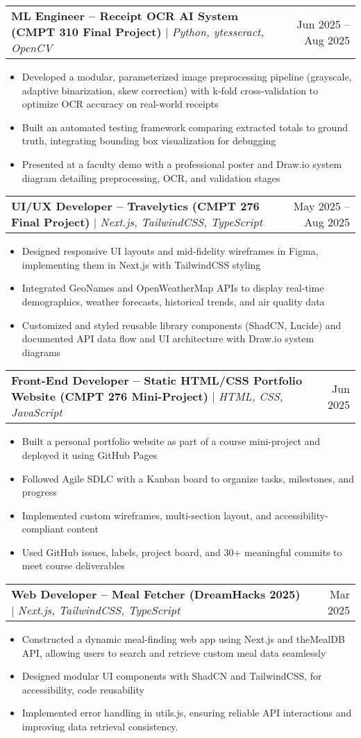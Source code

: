 \documentclass[letterpaper,10pt]{article}
\makeatletter
\newcommand{\resumeItem}[1]{
  \item\small{
    {#1 \vspace{-2pt}}
  }
}
\newcommand{\resumeProjectHeading}[2]{
    \item
    \begin{tabular*}{0.97\textwidth}{l@{\extracolsep{\fill}}r}
      \small#1 & #2 \\
    \end{tabular*}\vspace{-7pt}
}
\newcommand{\resumeItemListStart}{\begin{itemize}}
\newcommand{\resumeItemListEnd}{\end{itemize}\vspace{-5pt}}
\makeatother
\begin{document}
   \resumeProjectHeading
  {\textbf{ML Engineer – Receipt OCR AI System (CMPT 310 Final Project)} $|$ \emph{Python, ytesseract, OpenCV}}{Jun 2025 -- Aug 2025}
    \resumeItemListStart
      \resumeItem{Developed a modular, parameterized image preprocessing pipeline (grayscale, adaptive binarization, skew correction) with k-fold cross-validation to optimize OCR accuracy on real-world receipts}
      \resumeItem{Built an automated testing framework comparing extracted totals to ground truth, integrating bounding box visualization for debugging}
      \resumeItem{Presented at a faculty demo with a professional poster and Draw.io system diagram detailing preprocessing, OCR, and validation stages}
    \resumeItemListEnd



  
    \resumeProjectHeading
  {\textbf{UI/UX Developer – Travelytics (CMPT 276 Final Project)} $|$ \emph{Next.js, TailwindCSS, TypeScript}}{May 2025 -- Aug 2025}
    \resumeItemListStart
      \resumeItem{Designed responsive UI layouts and mid-fidelity wireframes in Figma, implementing them in Next.js with TailwindCSS styling}
      \resumeItem{Integrated GeoNames and OpenWeatherMap APIs to display real-time demographics, weather forecasts, historical trends, and air quality data}
      \resumeItem{Customized and styled reusable library components (ShadCN, Lucide) and documented API data flow and UI architecture with Draw.io system diagrams}
    \resumeItemListEnd

    
    

    \resumeProjectHeading
      {\textbf{Front-End Developer – Static HTML/CSS Portfolio Website (CMPT 276 Mini-Project)} $|$ \emph{HTML, CSS, JavaScript}}{Jun 2025}
      \resumeItemListStart
        \resumeItem{Built a personal portfolio website as part of a course mini-project and deployed it using GitHub Pages}
        \resumeItem{Followed Agile SDLC with a Kanban board to organize tasks, milestones, and progress}
        \resumeItem{Implemented custom wireframes, multi-section layout, and accessibility-compliant content}
        \resumeItem{Used GitHub issues, labels, project board, and 30+ meaningful commits to meet course deliverables}
    \resumeItemListEnd

    \resumeProjectHeading
      {\textbf{Web Developer -- Meal Fetcher (DreamHacks 2025)} $|$ \emph{Next.js, TailwindCSS, TypeScript}}{Mar 2025}
      \resumeItemListStart
        \resumeItem{Constructed a dynamic meal-finding web app using Next.js and theMealDB API, allowing users to search and retrieve custom meal data seamlessly}
        \resumeItem{Designed modular UI components with ShadCN and TailwindCSS, for accessibility, code reusability}
        \resumeItem{Implemented error handling in utils.js, ensuring reliable API interactions and improving data retrieval consistency.}
      \resumeItemListEnd
\end{document}
